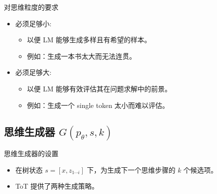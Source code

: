 \begin{frame}{对思维粒度的要求}
\begin{itemize}
    \item 必须足够小:
    
    \begin{itemize}
        \item 以便 LM 能够生成多样且有希望的样本。
        
        \item 例如：生成一本书太大而无法连贯。
    \end{itemize}
	
	\pause
    \bigskip
    \item 必须足够大:
    
    \begin{itemize}
        \item 以便 LM 能够有效评估其在问题求解中的前景。
        
        \item 例如：生成一个 single token 太小而难以评估。
    \end{itemize}
\end{itemize}
\end{frame}

\subsection{思维生成器 $G(p_\theta, s, k)$}

\begin{frame}{思维生成器的设置}
\begin{itemize}
    \item 在树状态 $s = [x, z_{1 \cdots i}]$ 下，为生成下一个思维步骤的 $k$ 个候选项。
	\bigskip
    \item ToT 提供了两种生成策略。
\end{itemize}
\end{frame}

